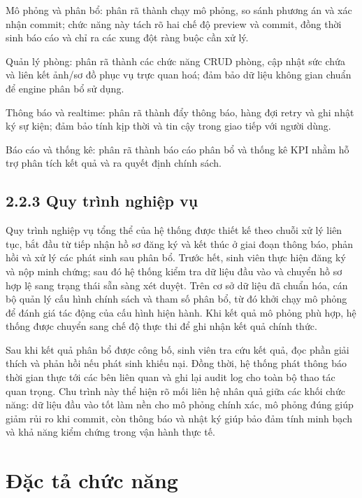 ﻿\documentclass[a4paper,12pt,openany,oneside]{report}
\begin{document}
Mô phỏng và phân bổ: phân rã thành chạy mô phỏng, so sánh phương án và xác nhận commit; chức năng này tách rõ hai chế độ preview và commit, đồng thời sinh báo cáo và chỉ ra các xung đột ràng buộc cần xử lý.

Quản lý phòng: phân rã thành các chức năng CRUD phòng, cập nhật sức chứa và liên kết ảnh/sơ đồ phục vụ trực quan hoá; đảm bảo dữ liệu không gian chuẩn để engine phân bổ sử dụng.

Thông báo và realtime: phân rã thành đẩy thông báo, hàng đợi retry và ghi nhật ký sự kiện; đảm bảo tính kịp thời và tin cậy trong giao tiếp với người dùng.

Báo cáo và thống kê: phân rã thành báo cáo phân bổ và thống kê KPI nhằm hỗ trợ phân tích kết quả và ra quyết định chính sách.

\subsection*{2.2.3 Quy trình nghiệp vụ}

Quy trình nghiệp vụ tổng thể của hệ thống được thiết kế theo chuỗi xử lý liên tục, bắt đầu từ tiếp nhận hồ sơ đăng ký và kết thúc ở giai đoạn thông báo, phản hồi và xử lý các phát sinh sau phân bổ. Trước hết, sinh viên thực hiện đăng ký và nộp minh chứng; sau đó hệ thống kiểm tra dữ liệu đầu vào và chuyển hồ sơ hợp lệ sang trạng thái sẵn sàng xét duyệt. Trên cơ sở dữ liệu đã chuẩn hóa, cán bộ quản lý cấu hình chính sách và tham số phân bổ, từ đó khởi chạy mô phỏng để đánh giá tác động của cấu hình hiện hành. Khi kết quả mô phỏng phù hợp, hệ thống được chuyển sang chế độ thực thi để ghi nhận kết quả chính thức.

Sau khi kết quả phân bổ được công bố, sinh viên tra cứu kết quả, đọc phần giải thích và phản hồi nếu phát sinh khiếu nại. Đồng thời, hệ thống phát thông báo thời gian thực tới các bên liên quan và ghi lại audit log cho toàn bộ thao tác quan trọng. Chu trình này thể hiện rõ mối liên hệ nhân quả giữa các khối chức năng: dữ liệu đầu vào tốt làm nền cho mô phỏng chính xác, mô phỏng đúng giúp giảm rủi ro khi commit, còn thông báo và nhật ký giúp bảo đảm tính minh bạch và khả năng kiểm chứng trong vận hành thực tế.

\section{Đặc tả chức năng}
\end{document}
